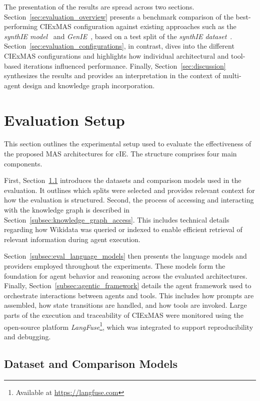 \documentclass[a4paper,oneside,bibliography=totoc]{scrbook}
\begin{document}
The presentation of the results are spread across two sections. Section~\ref{sec:evaluation_overview} presents a benchmark comparison of the best-performing CIExMAS configuration against existing approaches such as the \textit{synthIE model}~\cite{Josifoski2023} and \textit{GenIE}~\cite{Josifoski2021}, based on a test split of the \textit{synthIE dataset}~\cite{Josifoski2023}. Section~\ref{sec:evaluation_configurations}, in contrast, dives into the different CIExMAS configurations and highlights how individual architectural and tool-based iterations influenced performance. Finally, Section~\ref{sec:discussion} synthesizes the results and provides an interpretation in the context of multi-agent design and knowledge graph incorporation.

\section{Evaluation Setup}
\label{sec:evaluation_setup}

This section outlines the experimental setup used to evaluate the effectiveness of the proposed \ac{MAS} architectures for \ac{cIE}. The structure comprises four main components.

First, Section~\ref{subsec:dataset} introduces the datasets and comparison models used in the evaluation. It outlines which splits were selected and provides relevant context for how the evaluation is structured. Second, the process of accessing and interacting with the knowledge graph is described in Section~\ref{subsec:knowledge_graph_access}. This includes technical details regarding how Wikidata was queried or indexed to enable efficient retrieval of relevant information during agent execution.

Section~\ref{subsec:eval_language_models} then presents the language models and providers employed throughout the experiments. These models form the foundation for agent behavior and reasoning across the evaluated architectures. Finally, Section~\ref{subsec:agentic_framework} details the agent framework used to orchestrate interactions between agents and tools. This includes how prompts are assembled, how state transitions are handled, and how tools are invoked. Large parts of the execution and traceability of CIExMAS were monitored using the open-source platform \textit{LangFuse}\footnote{Available at \url{https://langfuse.com}}, which was integrated to support reproducibility and debugging.

\subsection{Dataset and Comparison Models}
\label{subsec:dataset}
\end{document}
